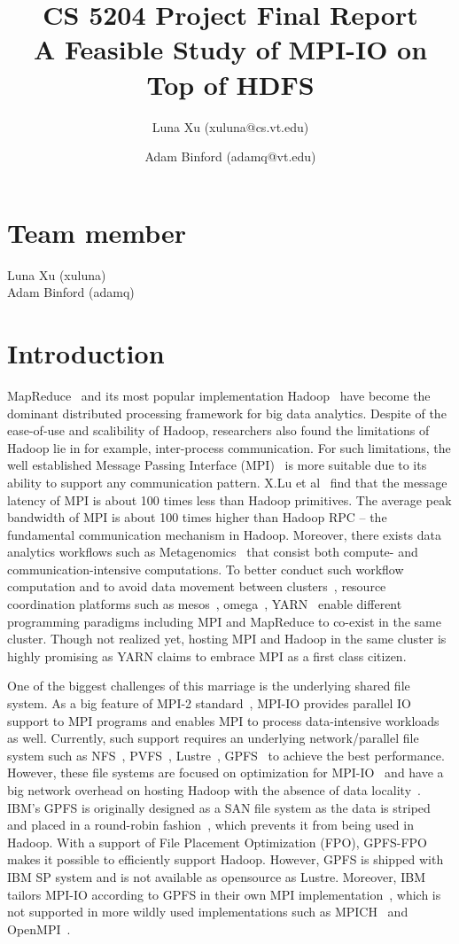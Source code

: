 \documentclass[11pt,titlepage]{article}
\author{Luna Xu (xuluna@cs.vt.edu) \and Adam Binford (adamq@vt.edu)}
\title{CS 5204 Project Final Report \\ A Feasible Study of MPI-IO on Top of HDFS}
\begin{document}
\maketitle

\section{Team member}
Luna Xu (xuluna)\\
Adam Binford (adamq)

\section{Introduction}
MapReduce~\cite{mr} and its most popular implementation Hadoop~\cite{hadoop}
have become the dominant distributed processing framework for big data
analytics. Despite of the ease-of-use and scalibility of Hadoop, researchers
also found the limitations of Hadoop lie in for example, inter-process
communication. For such limitations, the well established Message Passing
Interface (MPI)~\cite{mpi} is more suitable due to its ability to support any
communication pattern. X.Lu et al~\cite{xlu} find that  the
message latency of MPI is about 100 times less than Hadoop
primitives. The average peak bandwidth of MPI is about
100 times higher than Hadoop RPC -- the fundamental communication
mechanism in Hadoop. Moreover, there exists data analytics workflows such as
Metagenomics~\cite{meta} that consist both compute- and communication-intensive
computations. To better conduct such workflow computation and to avoid data
movement between clusters~\cite{???}, resource coordination platforms such as
mesos~\cite{mesos}, omega~\cite{omega}, YARN~\cite{yarn} enable different
programming paradigms including MPI and MapReduce to co-exist in the same
cluster. Though not realized yet, hosting MPI and Hadoop in the same cluster is
highly promising as YARN claims to embrace MPI as a first class citizen.

One of the biggest challenges of this marriage is the underlying shared file
system. As a big feature of MPI-2 standard~\cite{mpi}, MPI-IO provides parallel IO support
to MPI programs and enables MPI to process data-intensive workloads as well. Currently, such
support requires an underlying network/parallel file system such as NFS~\cite{nfs1},
PVFS~\cite{pvfs}, Lustre~\cite{lustre}, GPFS~\cite{gpfs} to achieve the best
performance. However, these file systems are focused on optimization for
MPI-IO~\cite{mpipvfs, mpilustre1, mpigpfs} and have a big network overhead on hosting
Hadoop with the absence of data locality~\cite{hadooplustre}. IBM's
GPFS is originally designed as a SAN file system as the data is striped and
placed in a round-robin fashion~\cite{gpfs}, which prevents it from being
used in Hadoop. With a support of File Placement Optimization (FPO), GPFS-FPO
makes it possible to efficiently support Hadoop.
However, GPFS is shipped with
IBM SP system and is not available as opensource as Lustre. Moreover, IBM
tailors MPI-IO according to GPFS in their own MPI implementation~\cite{mpigpfs},
which is not supported in more wildly used implementations such as MPICH~\cite{}
and OpenMPI~\cite{openmpi}.
\end{document}

